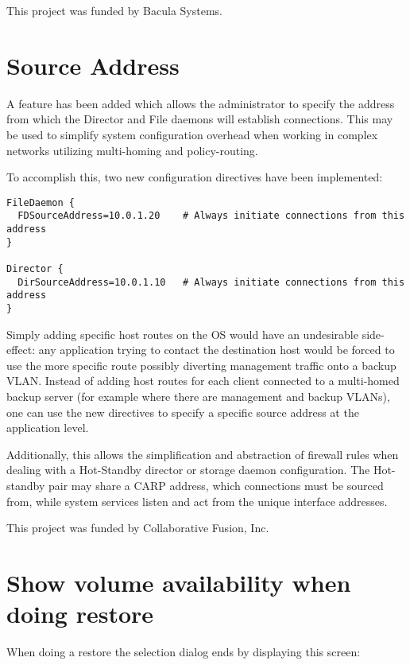 This project was funded by Bacula Systems.

\section{Source Address}

A feature has been added which allows the administrator to specify the address
from which the Director and File daemons will establish connections.  This
may be used to simplify system configuration overhead when working in complex
networks utilizing multi-homing and policy-routing.

To accomplish this, two new configuration directives have been implemented:
\begin{verbatim}
FileDaemon {
  FDSourceAddress=10.0.1.20    # Always initiate connections from this address
}

Director {
  DirSourceAddress=10.0.1.10   # Always initiate connections from this address
}
\end{verbatim}

Simply adding specific host routes on the OS
would have an undesirable side-effect: any
application trying to contact the destination host would be forced to use the
more specific route possibly diverting management traffic onto a backup VLAN.
Instead of adding host routes for each client connected to a multi-homed backup
server (for example where there are management and backup VLANs), one can
use the new directives to specify a specific source address at the application
level.

Additionally, this allows the simplification and abstraction of firewall rules
when dealing with a Hot-Standby director or storage daemon configuration.  The
Hot-standby pair may share a CARP address, which connections must be sourced
from, while system services listen and act from the unique interface addresses.

This project was funded by Collaborative Fusion, Inc.

\section{Show volume availability when doing restore}

When doing a restore the selection dialog ends by displaying this
screen:

